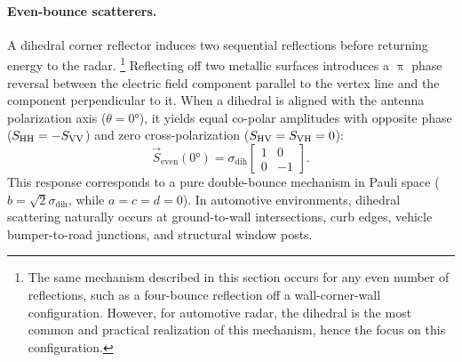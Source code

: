 \paragraph{Even-bounce scatterers.}
A dihedral corner reflector induces two sequential reflections before returning energy to the radar.%
    \footnote{The same mechanism described in this section occurs for any even number of reflections, such as a four-bounce reflection off a wall-corner-wall configuration.
    However, for automotive radar, the dihedral is the most common and practical realization of this mechanism, hence the focus on this configuration.}
Reflecting off two metallic surfaces introduces a $\uppi$ phase reversal between the electric field component parallel to the vertex line and the component perpendicular to it.
When a dihedral is aligned with the antenna polarization axis ($\theta = \ang{0}$), it yields equal co-polar amplitudes with opposite phase ($S_{\mathrm{HH}} = -S_{\mathrm{VV}}$) and zero cross-polarization ($S_{\mathrm{HV}} = S_{\mathrm{VH}} = 0$):
\begin{equation}
    \label{eq:canonical-even-bounce-0}
    \vec S_{\text{even}}(\ang{0}) = \sigma_{\text{dih}} \begin{bmatrix} 1 & 0 \\ 0 & -1 \end{bmatrix}.
\end{equation}
This response corresponds to a pure double-bounce mechanism in Pauli space ($b = \sqrt{2}\sigma_{\text{dih}}$, while $a = c = d = 0$).
In automotive environments, dihedral scattering naturally occurs at ground-to-wall intersections, curb edges, vehicle bumper-to-road junctions, and structural window posts.

